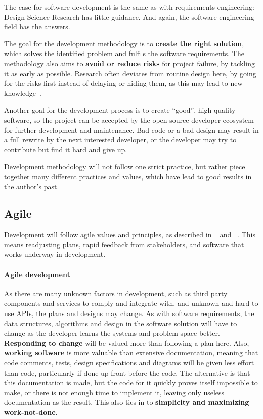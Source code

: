 
The case for software development is the same as with requirements engineering: Design Science Research has little guidance.
And again, the software engineering field has the answers.


The goal for the development methodology is to \textbf{create the right solution}, which solves the identified problem and fulfils the software requirements.
The methodology also aims to \textbf{avoid or reduce risks} for project failure, by tackling it as early as possible.
Research often deviates from routine design here, by going for the risks first instead of delaying or hiding them, as this may lead to new knowledge~\cite[p.~114]{oatesResearchingInformationSystems2006}.


Another goal for the development process is to create ``good'', high quality software, so the project can be accepted by the \gls{open source} developer ecosystem for further development and maintenance.
Bad code or a bad design may result in a full rewrite by the next interested developer, or the developer may try to contribute but find it hard and give up.


Development methodology will not follow one strict practice, but rather piece together many different practices and values, which have lead to good results in the author's past.


\subsection{Agile}

Development will follow agile values and principles, as described in ~\cite{kentbeckManifestoAgileSoftware2001} and ~\cite{PrinciplesAgileManifesto}.
This means readjusting plans, rapid feedback from stakeholders, and software that works underway in development.

\paragraph{Agile development}
As there are many unknown factors in development, such as third party components and services to comply and integrate with, and unknown and hard to use \glspl{API}, the plans and designs may change.
As with software requirements, the data structures, algorithms and design in the software solution will have to change as the developer learns the systems and problem space better.
\textbf{Responding to change} will be valued more than following a plan here.
Also, \textbf{working software} is more valuable than extensive documentation, meaning that code comments, tests, design specifications and diagrams will be given less effort than code, particularly if done up-front before the code.
The alternative is that this documentation is made, but the code for it quickly proves itself impossible to make, or there is not enough time to implement it, leaving only useless documentation as the result.
This also ties in to \textbf{simplicity and maximizing work-not-done}.



